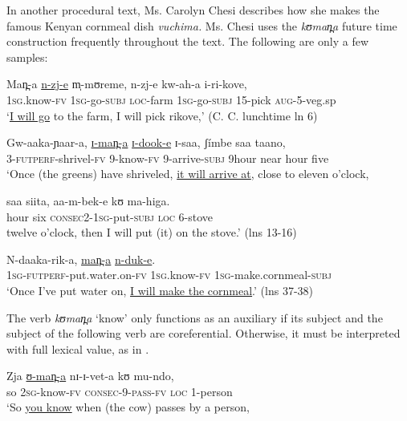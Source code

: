 \documentclass[output=paper]{langsci/langscibook}
\begin{document}
In another procedural text, Ms. Carolyn Chesi describes how she makes the famous Kenyan cornmeal dish \textit{vuchima. }Ms. Chesi uses the \textit{kʊman̪a }future time construction frequently throughout the text. The following are only a few samples:

\ea\label{ex:sarvasy:22}
\gll Man̪-a     \underline{n-zj-e}     m̩-mʊreme,   n-zj-e     kw-ah-a     i-ri-kove, \\
\textsc{1sg}.know-\textsc{fv}  \textsc{1sg}{}-go-\textsc{subj}  \textsc{loc}{}-farm  \textsc{1sg}{}-go-\textsc{subj}  15-pick    \textsc{aug}{}-5-veg.sp \\
\glt ‘\underline{I will go} to the farm, I will pick rikove,’ (C. C. lunchtime ln 6)
\z

\ea\label{ex:sarvasy:23}
\gll Gw-aaka-ɲaar-a,   \underline{ɪ{}-man̪-a}   \underline{ɪ{}-dook-e}   ɪ{}-saa,   ʃ\'{i}mbe   saa   taano, \\
3-\textsc{futperf-}shrivel-\textsc{fv}  9-know-\textsc{fv}  9-arrive-\textsc{subj}    9hour    near  hour  five \\
\glt ‘Once (the greens) have shriveled, \underline{it will arrive at}, close to eleven o’clock,

\gll saa   siita,   aa-m-bek-e       kʊ   ma-higa. \\
hour  six  \textsc{consec2-1sg}{}-put-\textsc{subj}  \textsc{loc}  6-stove \\
\glt twelve o'clock, then I will put (it) on the stove.’ (lns 13-16)
\z 

\ea\label{ex:sarvasy:24}
\gll N-daaka-rik-a,         \underline{man̪-a}     \underline{n-duk-e}. \\
\textsc{1sg-futperf}{}-put.water.on-\textsc{fv}  1\textsc{sg.}know-\textsc{fv}    \textsc{1sg}-make.cornmeal-\textsc{subj} \\
\glt ‘Once I've put water on, \underline{I will make the cornmeal}.’ (lns 37-38)
\z

The verb \textit{kʊman̪a }‘know’ only functions as an auxiliary if its subject and the subject of the following verb are coreferential. Otherwise, it must be interpreted with full lexical value, as in .

\ea\label{ex:sarvasy:25}
\gll Zja   \underline{ʊ{}-man̪-a}     nɪ-ɪ{}-vet-a     kʊ     mu-ndo, \\
so  2\textsc{sg-}know\textsc{{}-fv}  \textsc{consec}{}-9-\textsc{pass}{}-\textsc{fv}   \textsc{loc}  1-person \\
\glt ‘So \underline{you know} when (the cow) passes by a person,
\end{document}
